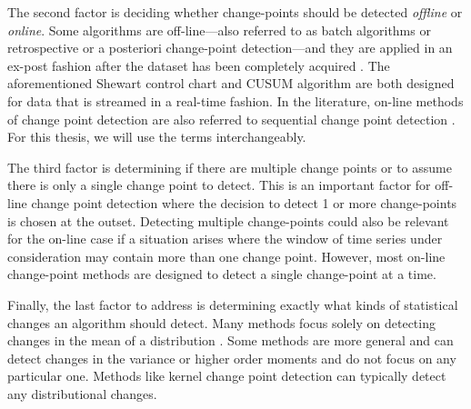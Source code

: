 
The second factor is deciding whether change-points should be detected \textit{offline} or \textit{online}. Some algorithms are off-line---also referred to  as batch algorithms or retrospective or a posteriori change-point detection---and they are applied in an ex-post fashion after the dataset has been completely acquired \cite{truong2018review}. The aforementioned Shewart control chart and CUSUM algorithm are both designed for data that is streamed in a real-time fashion. In the literature, on-line methods of change point detection are also referred to sequential change point detection  \cite{tartakovsky2014sequential}. For this thesis, we will use the terms interchangeably.%


The third factor is determining if there are multiple change points or to assume there is only a single change point to detect. This is an important  factor for off-line change point detection where the decision to detect 1 or more change-points is chosen at the outset.  Detecting multiple change-points could also be relevant for the on-line case if a situation arises where the window of time series under consideration may contain more than one change point. However, most on-line change-point methods are designed to detect a single change-point at a time.

Finally, the last factor to address is determining exactly what kinds of statistical changes an algorithm should detect. Many methods focus solely on detecting changes in the mean of a distribution \cite{lee2010change}. Some methods are more general and can detect changes in the variance or higher order moments and do not focus on any particular one. Methods like kernel change point detection can typically detect any distributional changes. 


